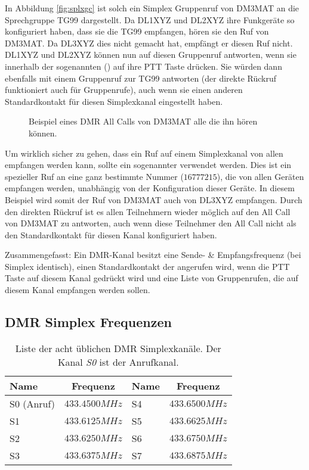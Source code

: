 In Abbildung \ref{fig:splxgc} ist solch ein Simplex Gruppenruf von DM3MAT an die Sprechgruppe TG99 dargestellt. Da DL1XYZ und DL2XYZ ihre Funkgeräte so konfiguriert haben, dass sie die TG99 empfangen, hören sie den Ruf von DM3MAT. Da DL3XYZ dies nicht gemacht hat, empfängt er diesen Ruf nicht. DL1XYZ und DL2XYZ können nun auf diesen Gruppenruf antworten, wenn sie innerhalb der sogenannten  () auf ihre PTT Taste drücken. Sie würden dann ebenfalls mit einem Gruppenruf zur TG99 antworten (der direkte Rückruf funktioniert auch für Gruppenrufe), auch wenn sie einen anderen Standardkontakt für diesen Simplexkanal eingestellt haben.

\begin{figure}[!ht]
  \centering
  
  \caption{Beispiel eines DMR All Calls von DM3MAT alle die ihn hören können.} \label{fig:splxac}
\end{figure}

Um wirklich sicher zu gehen, dass ein Ruf auf einem Simplexkanal von allen empfangen werden kann, sollte ein sogenannter  verwendet werden. Dies ist ein spezieller Ruf an eine ganz bestimmte Nummer ($16777215$), die von allen Geräten empfangen werden, unabhängig von der Konfiguration dieser Geräte. In diesem Beispiel wird somit der Ruf von DM3MAT auch von DL3XYZ empfangen. Durch den direkten Rückruf ist es allen Teilnehmern wieder möglich auf den All Call von DM3MAT zu antworten, auch wenn diese Teilnehmer den All Call nicht als den Standardkontakt für diesen Kanal konfiguriert haben. 

\begin{merke}
 Zusammengefasst: Ein DMR-Kanal besitzt eine Sende- \& Empfangsfrequenz (bei Simplex identisch), einen Standardkontakt der angerufen wird, wenn die PTT Taste auf diesem Kanal gedrückt wird und eine Liste von Gruppenrufen, die auf diesem Kanal empfangen werden sollen. 
\end{merke}

\subsection{DMR Simplex Frequenzen}
\begin{table}[!ht]
 \centering
 \begin{tabular}{|l|c||l|c|} \hline
  Name & Frequenz & Name & Frequenz \\ \hline \hline
  S0 (Anruf) & $433.4500 MHz$ & S4 & $433.6500 MHz$ \\
  S1         & $433.6125 MHz$ & S5 & $433.6625 MHz$ \\
  S2         & $433.6250 MHz$ & S6 & $433.6750 MHz$ \\
  S3         & $433.6375 MHz$ & S7 & $433.6875 MHz$ \\ \hline
 \end{tabular}
 \caption{Liste der acht üblichen DMR Simplexkanäle. Der Kanal \emph{S0} ist der Anrufkanal.} \label{tab:simplex}
\end{table}

